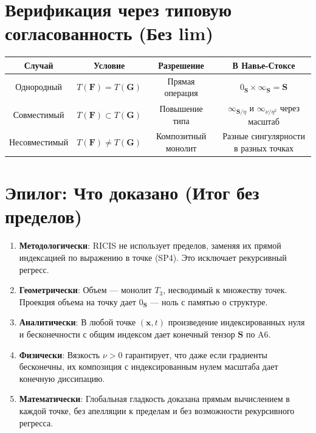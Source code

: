 \documentclass[12pt]{article}
\newcommand{\0}{\mathbf{0}}
\newcommand{\1}{\mathds{1}}
\newcommand{\bx}{\mathbf{x}}
\newcommand{\bS}{\mathbf{S}}
\newcommand{\bF}{\mathbf{F}}
\newcommand{\bG}{\mathbf{G}}
\begin{document}
\section{Верификация через типовую согласованность (Без lim)}

\begin{center}
\begin{tabular}{|c|c|c|c|}
\hline
\textbf{Случай} & \textbf{Условие} & \textbf{Разрешение} & \textbf{В Навье-Стоксе} \\
\hline
Однородный & $T(\bF) = T(\bG)$ & Прямая операция & $0_{\bS} \times \infty_{\bS} = \bS$ \\
\hline
Совместимый & $T(\bF) \subset T(\bG)$ & Повышение типа & $\infty_{\bS/\eta}$ и $\infty_{\nu/\eta^2}$ через масштаб \\
\hline
Несовместимый & $T(\bF) \neq T(\bG)$ & Композитный монолит & Разные сингулярности в разных точках \\
\hline
\end{tabular}
\end{center}

\section*{Эпилог: Что доказано (Итог без пределов)}

\begin{enumerate}
    \item \textbf{Методологически}: RICIS не использует пределов, заменяя их прямой индексацией по выражению в точке (SP4). Это исключает рекурсивный регресс.
    
    \item \textbf{Геометрически}: Объем --- монолит $T_3$, несводимый к множеству точек. Проекция объема на точку дает $0_{\bS}$ --- ноль с памятью о структуре.
    
    \item \textbf{Аналитически}: В любой точке $(\bx,t)$ произведение индексированных нуля и бесконечности с общим индексом дает конечный тензор $\bS$ по A6.
    
    \item \textbf{Физически}: Вязкость $\nu > 0$ гарантирует, что даже если градиенты бесконечны, их композиция с индексированным нулем масштаба дает конечную диссипацию.
    
    \item \textbf{Математически}: Глобальная гладкость доказана прямым вычислением в каждой точке, без апелляции к пределам и без возможности рекурсивного регресса.
\end{enumerate}
\end{document}
